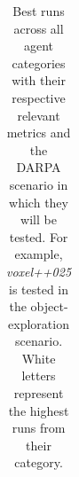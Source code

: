 \begin{longtable}{|l|c|c|c|c|}
    

  

    \caption{Best runs across all agent categories with their respective relevant metrics and the DARPA scenario in which they will be tested. For example, \textit{voxel++025} is tested in the object-exploration scenario. White letters represent the highest runs from their category.
    } %
    \label{tab:results-darpa-candidates}
\end{longtable}

